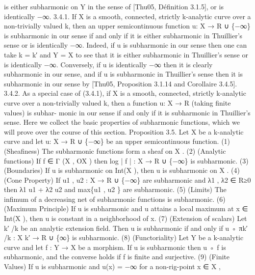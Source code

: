 \documentclass[
  10pt,
]{article}
\newenvironment{Shaded}{}{}
\newcommand{\NormalTok}[1]{#1}
\begin{document}
\begin{Shaded}
\begin{Highlighting}[]
\NormalTok{is either subharmonic on Y in the sense of [Thu05, Définition 3.1.5], or is identically −∞.}
\NormalTok{3.4.1. If X is a smooth, connected, strictly k{-}analytic curve over a non{-}trivially valued k,}
\NormalTok{then an upper semicontinuous function u: X → R ∪ \{−∞\} is subharmonic in our sense}
\NormalTok{if and only if it is either subharmonic in Thuillier’s sense or is identically −∞. Indeed, if}
\NormalTok{u is subharmonic in our sense then one can take k = k′ and Y = X to see that it is either}
\NormalTok{subharmonic in Thuillier’s sense or is identically −∞. Conversely, if u is identically −∞}
\NormalTok{then it is clearly subharmonic in our sense, and if u is subharmonic in Thuillier’s sense}
\NormalTok{then it is subharmonic in our sense by [Thu05, Proposition 3.1.14 and Corollaire 3.4.5].}
\NormalTok{3.4.2. As a special case of (3.4.1), if X is a smooth, connected, strictly k{-}analytic curve}
\NormalTok{over a non{-}trivially valued k, then a function u: X → R (taking finite values) is subhar{-}}
\NormalTok{monic in our sense if and only if it is subharmonic in Thuillier’s sense.}
\NormalTok{  Here we collect the basic properties of subharmonic functions, which we will prove}
\NormalTok{over the course of this section.}
\NormalTok{Proposition 3.5. Let X be a k{-}analytic curve and let u: X → R ∪ \{−∞\} be an upper}
\NormalTok{semicontinuous function.}
\NormalTok{   (1) (Sheafiness) The subharmonic functions form a sheaf on X .}
\NormalTok{   (2) (Analytic functions) If f ∈ Γ (X , OX ) then log | f | : X → R ∪ \{−∞\} is subharmonic.}
\NormalTok{   (3) (Boundaries) If u is subharmonic on Int(X ), then u is subharmonic on X .}
\NormalTok{   (4) (Cone Property) If u1 , u2 : X → R ∪ \{−∞\} are subharmonic and λ1 , λ2 ∈ R≥0 then}
\NormalTok{       λ1 u1 + λ2 u2 and max\{u1 , u2 \} are subharmonic.}
\NormalTok{   (5) (Limits) The infimum of a decreasing net of subharmonic functions is subharmonic.}
\NormalTok{   (6) (Maximum Principle) If u is subharmonic and u attains a local maximum at x ∈}
\NormalTok{       Int(X ), then u is constant in a neighborhood of x.}
\NormalTok{   (7) (Extension of scalars) Let k′ /k be an analytic extension field. Then u is subharmonic}
\NormalTok{       if and only if u ◦ πk′ /k : X k′ → R ∪ \{∞\} is subharmonic.}
\NormalTok{   (8) (Functoriality) Let Y be a k{-}analytic curve and let f : Y → X be a morphism. If u}
\NormalTok{       is subharmonic then u ◦ f is subharmonic, and the converse holds if f is finite and}
\NormalTok{       surjective.}
\NormalTok{   (9) (Finite Values) If u is subharmonic and u(x) = −∞ for a non{-}rig{-}point x ∈ X ,}

\end{Highlighting}
\end{Shaded}
\end{document}
